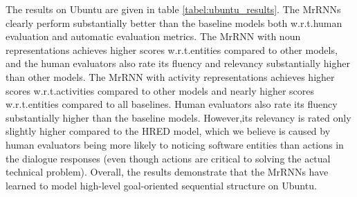 \documentclass{article}
\begin{document}
The results on Ubuntu are given in table \ref{tabel:ubuntu_results}.
The MrRNNs clearly perform substantially better than the baseline models both w.r.t.\@ human evaluation and automatic evaluation metrics.
The MrRNN with noun representations achieves  higher scores w.r.t.\@ entities compared to other models,
and the human evaluators also rate its fluency and relevancy substantially higher than other models.
The MrRNN with activity representations achieves  higher scores w.r.t.\@ activities compared to other models and nearly  higher scores w.r.t.\@ entities compared to all baselines.
Human evaluators also rate its fluency substantially higher than the baseline models. 
However,its relevancy is rated only slightly higher compared to the HRED model, which we believe is caused by human evaluators being more likely to noticing software entities than actions in the dialogue responses (even though actions are critical to solving the actual technical problem).
Overall, the results demonstrate that the MrRNNs have learned to model high-level goal-oriented sequential structure on Ubuntu.
\end{document}
